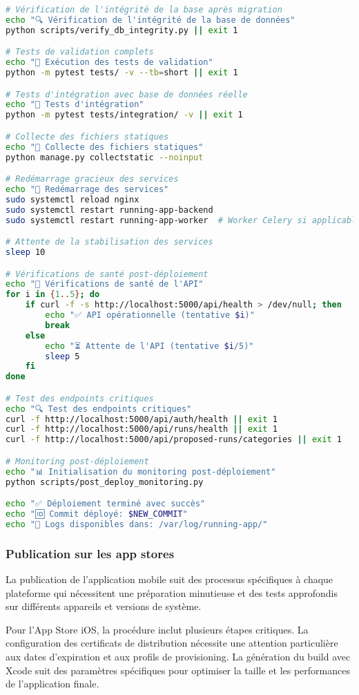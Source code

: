 \begin{lstlisting}[language=bash, caption=Script de déploiement backend production]
# Vérification de l'intégrité de la base après migration
echo "🔍 Vérification de l'intégrité de la base de données"
python scripts/verify_db_integrity.py || exit 1

# Tests de validation complets
echo "🧪 Exécution des tests de validation"
python -m pytest tests/ -v --tb=short || exit 1

# Tests d'intégration avec base de données réelle
echo "🔗 Tests d'intégration"
python -m pytest tests/integration/ -v || exit 1

# Collecte des fichiers statiques
echo "📁 Collecte des fichiers statiques"
python manage.py collectstatic --noinput

# Redémarrage gracieux des services
echo "🔄 Redémarrage des services"
sudo systemctl reload nginx
sudo systemctl restart running-app-backend
sudo systemctl restart running-app-worker  # Worker Celery si applicable

# Attente de la stabilisation des services
sleep 10

# Vérifications de santé post-déploiement
echo "🏥 Vérifications de santé de l'API"
for i in {1..5}; do
    if curl -f -s http://localhost:5000/api/health > /dev/null; then
        echo "✅ API opérationnelle (tentative $i)"
        break
    else
        echo "⏳ Attente de l'API (tentative $i/5)"
        sleep 5
    fi
done

# Test des endpoints critiques
echo "🔍 Test des endpoints critiques"
curl -f http://localhost:5000/api/auth/health || exit 1
curl -f http://localhost:5000/api/runs/health || exit 1
curl -f http://localhost:5000/api/proposed-runs/categories || exit 1

# Monitoring post-déploiement
echo "📊 Initialisation du monitoring post-déploiement"
python scripts/post_deploy_monitoring.py

echo "✅ Déploiement terminé avec succès"
echo "🆔 Commit déployé: $NEW_COMMIT"
echo "📝 Logs disponibles dans: /var/log/running-app/"
\end{lstlisting}

\subsubsection{Publication sur les app stores}

La publication de l'application mobile suit des processus spécifiques à chaque plateforme qui nécessitent une préparation minutieuse et des tests approfondis sur différents appareils et versions de système.

Pour l'App Store iOS, la procédure inclut plusieurs étapes critiques. La configuration des certificats de distribution nécessite une attention particulière aux dates d'expiration et aux profils de provisioning. La génération du build avec Xcode suit des paramètres spécifiques pour optimiser la taille et les performances de l'application finale.


